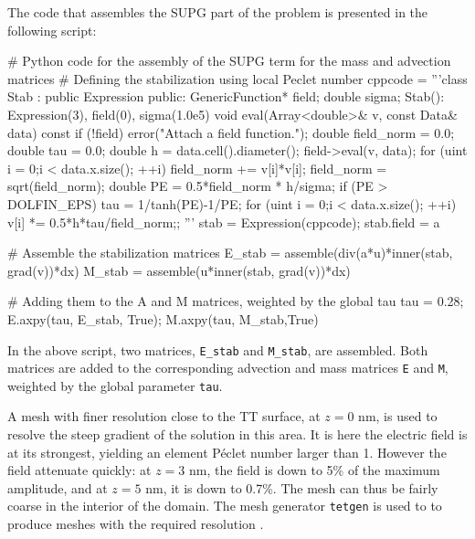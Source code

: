 The \pydolfin code that assembles the SUPG part of the problem is
presented in the following script:
\begin{python}
# Python code for the assembly of the SUPG term for the mass and advection matrices
# Defining the stabilization using local Peclet number
cppcode = '''class Stab : public Expression {
public:
  GenericFunction* field; double sigma;
  Stab(): Expression(3), field(0), sigma(1.0e5){}
  void eval(Array<double>& v, const Data& data) const {
    if (!field)
      error("Attach a field function.");
    double field_norm = 0.0; double tau = 0.0;
    double h = data.cell().diameter();
    field->eval(v, data);
    for (uint i = 0;i < data.x.size(); ++i)
      field_norm += v[i]*v[i];
    field_norm = sqrt(field_norm);
    double PE = 0.5*field_norm * h/sigma;
    if (PE > DOLFIN_EPS)
      tau = 1/tanh(PE)-1/PE;
    for (uint i = 0;i < data.x.size(); ++i)
      v[i] *= 0.5*h*tau/field_norm;}};
'''
stab = Expression(cppcode); stab.field = a

# Assemble the stabilization matrices
E_stab = assemble(div(a*u)*inner(stab, grad(v))*dx)
M_stab = assemble(u*inner(stab, grad(v))*dx)

# Adding them to the A and M matrices, weighted by the global tau
tau = 0.28; E.axpy(tau, E_stab, True); M.axpy(tau, M_stab,True)
\end{python}
In the above script, two matrices, \texttt{E\_stab} and
\texttt{M\_stab}, are assembled. Both matrices are added to the
corresponding advection and mass matrices \texttt{E} and \texttt{M},
weighted by the global parameter \texttt{tau}.\par

A mesh with finer resolution close to the TT surface, at $z=0$ nm, is
used to resolve the steep gradient of the solution in this area. It is
here the electric field is at its strongest, yielding an element
P\'eclet number larger than 1. However the field attenuate quickly: at
$z=3$ nm, the field is down to 5\% of the maximum amplitude, and at
$z=5$ nm, it is down to 0.7\%. The mesh can thus be fairly coarse in
the interior of the domain. The mesh generator \texttt{tetgen} is used
to to produce meshes with the required resolution \cite{Si2007}.\par


